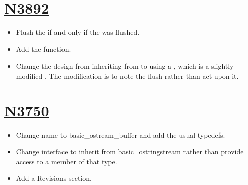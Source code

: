 \documentclass[ebook,11pt,article]{memoir}
\begin{document}
\section{\href{https://wg21.link/N3892}{N3892}}
\begin{itemize}
\item Flush the  if and only if the  was flushed.
\item Add the  function.
\item Change the design from inheriting from  to using a , which is a slightly modified . The modification is to note the flush rather than act upon it.
\end{itemize}
\section{\href{https://wg21.link/N3750}{N3750}}
\begin{itemize}
\item Change name to basic_ostream_buffer and add the usual typedefs.
\item Change interface to inherit from basic_ostringstream rather than provide access to a member of that type.
\item Add a Revisions section.
\end{itemize}
\end{document}
